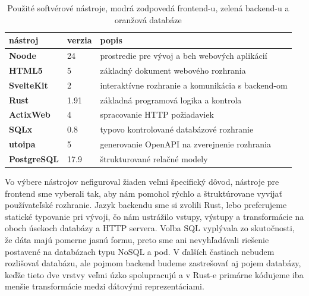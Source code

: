 \begin{table}[h!]
    \begin{center}
        \begin{tabularx}{\textwidth}{ |l|l|X| } 
         \hline
         \textbf{nástroj} & \textbf{verzia} & \textbf{popis} \\ 
         \hline
         \rowcolor{red!50}
         \textbf{Noode} & 24 & prostredie pre vývoj a beh webových aplikácií \\ 
         \hline
         \hline
         \rowcolor{cyan!50}
         \textbf{HTML5} & 5 & základný dokument webového rozhrania \\ 
         \hline
         \rowcolor{cyan!50}
         \textbf{SvelteKit} & 2 & interaktívne rozhranie a komunikácia s backend-om \\ 
         \hline
         \rowcolor{lime!50}
         \textbf{Rust} & 1.91 & základná programová logika a kontrola \\ 
         \hline
         \rowcolor{lime!50}
         \textbf{ActixWeb} & 4 & spracovanie HTTP požiadaviek \\ 
         \hline
         \rowcolor{lime!50}
         \textbf{SQLx} & 0.8 & typovo kontrolované databázové rozhranie \\ 
         \hline
         \rowcolor{lime!50}
         \textbf{utoipa} & 5 & generovanie OpenAPI na zverejnenie rozhrania \\ 
         \hline
         \rowcolor{orange!50}
         \textbf{PostgreSQL} & 17.9 & štrukturované relačné modely \\ 
         \hline
        \end{tabularx}
    \end{center}
    \caption{Použité softvérové nástroje, modrá zodpovedá frontend-u, zelená backend-u a oranžová databáze}
    \label{tab:swvers}
\end{table}

Vo výbere nástrojov nefiguroval žiaden veľmi špecifický dôvod, nástroje pre frontend sme vyberali tak, aby nám pomohol rýchlo a
štruktúrovane vyvíjať používateľské rozhranie. Jazyk backendu sme si zvolili Rust, lebo preferujeme statické typovanie pri vývoji,
čo nám ustrážilo vstupy, výstupy a transformácie na oboch úsekoch databázy a HTTP servera. Voľba SQL vyplývala zo skutočnosti,
že dáta majú pomerne jasnú formu, preto sme ani nevyhľadávali riešenie postavené na databázach typu NoSQL a pod. V ďalších častiach
nebudem rozlišovať databázu, ale pojmom backend budeme zastrešovať aj pojem databázy, keďže tieto dve vrstvy veľmi úzko spolupracujú
a v Rust-e primárne kódujeme iba menšie transformácie medzi dátovými reprezentáciami.

